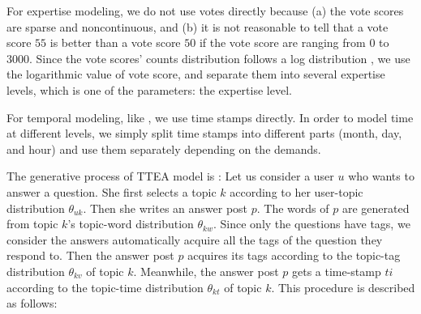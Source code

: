 {{{{{{{For expertise modeling, we do not use votes directly because (a) the vote scores are sparse and noncontinuous, and (b) it is not reasonable to tell that a vote score $55$ is better than a vote score $50$ if the vote score are ranging from $0$ to $3000$.  Since the vote scores' counts distribution follows a log distribution \cite{yang2013cqarank}, we use the logarithmic value of vote score, and separate them into several expertise levels, which is one of the parameters: the expertise level.

For temporal modeling, like \cite{wang2006topics} \cite{hu2014user}, we use time stamps directly. In order to model time at different levels, we simply split time stamps into different parts (month, day, and hour) and use them separately depending on the demands.



The generative process of TTEA model is :
Let us consider a user $u$ who wants to answer a question. She first selects a topic $k$ according to her user-topic distribution $\theta_{uk}$. Then she writes an answer post $p$. The words of $p$ are generated from topic $k$'s topic-word distribution $\theta_{kw}$. Since only the questions have tags, we consider the answers automatically acquire all the tags of the question they respond to. Then the answer post $p$ acquires its tags according to the topic-tag distribution $\theta_{kv}$ of topic $k$. Meanwhile, the answer post $p$ gets a time-stamp $ti$ according to the topic-time distribution $\theta_{kt}$ of topic $k$.
This procedure is described as follows:


}}}}}}}
